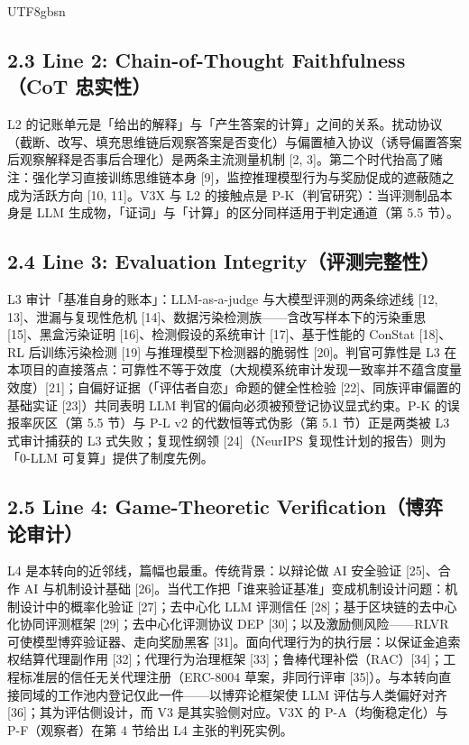 \documentclass[10pt,a4paper]{article}
\begin{document}
\begin{CJK}{UTF8}{gbsn}
\subsection*{2.3 Line 2: Chain-of-Thought Faithfulness（CoT 忠实性）}L2 的记账单元是「给出的解释」与「产生答案的计算」之间的关系。扰动协议（截断、改写、填充思维链后观察答案是否变化）与偏置植入协议（诱导偏置答案后观察解释是否事后合理化）是两条主流测量机制 [2, 3]。第二个时代抬高了赌注：强化学习直接训练思维链本身 [9]，监控推理模型行为与奖励促成的遮蔽随之成为活跃方向 [10, 11]。V3X 与 L2 的接触点是 P-K（判官研究）：当评测制品本身是 LLM 生成物，「证词」与「计算」的区分同样适用于判定通道（第 5.5 节）。

\subsection*{2.4 Line 3: Evaluation Integrity（评测完整性）}L3 审计「基准自身的账本」：LLM-as-a-judge 与大模型评测的两条综述线 [12, 13]、泄漏与复现性危机 [14]、数据污染检测族——含改写样本下的污染重思 [15]、黑盒污染证明 [16]、检测假设的系统审计 [17]、基于性能的 ConStat [18]、RL 后训练污染检测 [19] 与推理模型下检测器的脆弱性 [20]。判官可靠性是 L3 在本项目的直接落点：可靠性不等于效度（大规模系统审计发现一致率并不蕴含度量效度）[21]；自偏好证据（「评估者自恋」命题的健全性检验 [22]、同族评审偏置的基础实证 [23]）共同表明 LLM 判官的偏向必须被预登记协议显式约束。P-K 的误报率灰区（第 5.5 节）与 P-L v2 的代数恒等式伪影（第 5.1 节）正是两类被 L3 式审计捕获的 L3 式失败；复现性纲领 [24]（NeurIPS 复现性计划的报告）则为「0-LLM 可复算」提供了制度先例。

\subsection*{2.5 Line 4: Game-Theoretic Verification（博弈论审计）}L4 是本转向的近邻线，篇幅也最重。传统背景：以辩论做 AI 安全验证 [25]、合作 AI 与机制设计基础 [26]。当代工作把「谁来验证基准」变成机制设计问题：机制设计中的概率化验证 [27]；去中心化 LLM 评测信任 [28]；基于区块链的去中心化协同评测框架 [29]；去中心化评测协议 DEP [30]；以及激励侧风险——RLVR 可使模型博弈验证器、走向奖励黑客 [31]。面向代理行为的执行层：以保证金追索权结算代理副作用 [32]；代理行为治理框架 [33]；鲁棒代理补偿（RAC）[34]；工程标准层的信任无关代理注册（ERC-8004 草案，非同行评审 [35]）。与本转向直接同域的工作池内登记仅此一件——以博弈论框架使 LLM 评估与人类偏好对齐 [36]；其为评估侧设计，而 V3 是其实验侧对应。V3X 的 P-A（均衡稳定化）与 P-F（观察者）在第 4 节给出 L4 主张的判死实例。


\end{CJK}
\end{document}
